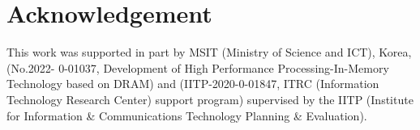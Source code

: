 \section*{Acknowledgement}
\label{Acknowledgement}

This work was supported in part by MSIT (Ministry of Science and ICT), Korea, (No.2022- 0-01037, Development of High Performance Processing-In-Memory Technology based on DRAM) and (IITP-2020-0-01847, ITRC (Information Technology Research Center) support program) supervised by the IITP (Institute for Information \& Communications Technology Planning \& Evaluation).